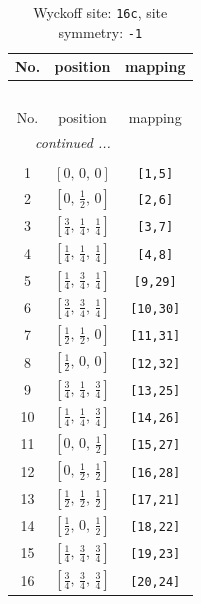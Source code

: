 \documentclass[fleqn,8pt]{jsarticle}
\begin{document}
\begin{longtable}{ccc}
\caption{Wyckoff site: {\tt 16c}, site symmetry: {\tt -1}}
 \\
 \hline \hline
No. & position & mapping \\ \hline \endfirsthead

\multicolumn{2}{l}{\tablename\ \thetable{}} \\
 \hline \hline
No. & position & mapping \\ \hline \endhead

 \hline \hline
\multicolumn{2}{r}{\footnotesize\it continued ...} \\ \endfoot

 \hline \hline
\multicolumn{2}{r}{} \\ \endlastfoot

1 & $\left[ 0,\, 0,\, 0 \right]$ & {\tt [1,5]} \\ \hline
2 & $\left[ 0,\, \frac{1}{2},\, 0 \right]$ & {\tt [2,6]} \\ \hline
3 & $\left[ \frac{3}{4},\, \frac{1}{4},\, \frac{1}{4} \right]$ & {\tt [3,7]} \\ \hline
4 & $\left[ \frac{1}{4},\, \frac{1}{4},\, \frac{1}{4} \right]$ & {\tt [4,8]} \\ \hline
5 & $\left[ \frac{1}{4},\, \frac{3}{4},\, \frac{1}{4} \right]$ & {\tt [9,29]} \\ \hline
6 & $\left[ \frac{3}{4},\, \frac{3}{4},\, \frac{1}{4} \right]$ & {\tt [10,30]} \\ \hline
7 & $\left[ \frac{1}{2},\, \frac{1}{2},\, 0 \right]$ & {\tt [11,31]} \\ \hline
8 & $\left[ \frac{1}{2},\, 0,\, 0 \right]$ & {\tt [12,32]} \\ \hline
9 & $\left[ \frac{3}{4},\, \frac{1}{4},\, \frac{3}{4} \right]$ & {\tt [13,25]} \\ \hline
10 & $\left[ \frac{1}{4},\, \frac{1}{4},\, \frac{3}{4} \right]$ & {\tt [14,26]} \\ \hline
11 & $\left[ 0,\, 0,\, \frac{1}{2} \right]$ & {\tt [15,27]} \\ \hline
12 & $\left[ 0,\, \frac{1}{2},\, \frac{1}{2} \right]$ & {\tt [16,28]} \\ \hline
13 & $\left[ \frac{1}{2},\, \frac{1}{2},\, \frac{1}{2} \right]$ & {\tt [17,21]} \\ \hline
14 & $\left[ \frac{1}{2},\, 0,\, \frac{1}{2} \right]$ & {\tt [18,22]} \\ \hline
15 & $\left[ \frac{1}{4},\, \frac{3}{4},\, \frac{3}{4} \right]$ & {\tt [19,23]} \\ \hline
16 & $\left[ \frac{3}{4},\, \frac{3}{4},\, \frac{3}{4} \right]$ & {\tt [20,24]} \\
\end{longtable}
\end{document}
